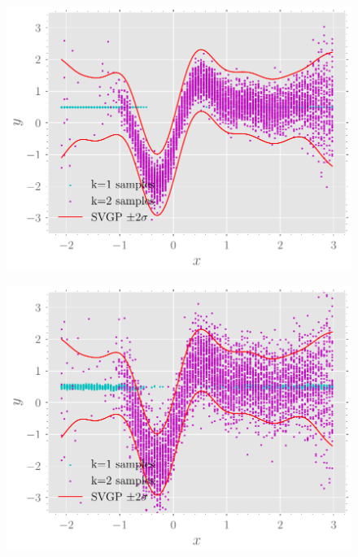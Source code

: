 \documentclass{mimosis-class/mimosis}
\numberwithin{equation}{chapter}
\newcommand{\modeInd}{\ensuremath{k}}
\newcommand{\ModeInd}{\ensuremath{\MakeUppercase{\modeInd}}}
\begin{document}
{\begin{figure}[hbt!]
\begin{minipage}[r]{0.49\textwidth}
\label{fig-y-means-mcycle-two-experts-further}
\end{minipage}
\begin{minipage}[r]{0.49\textwidth}
\includegraphics[width=\textwidth]{./images/model/mcycle/K=2_L2/y_samples.pdf}
\label{fig-y-samples-mcycle-two-experts-tight}
\end{minipage}
\begin{minipage}[r]{0.49\textwidth}
\includegraphics[width=\textwidth]{./images/model/mcycle/K=2_L3/y_samples.pdf}

\end{minipage}
\end{figure}}
\end{document}
